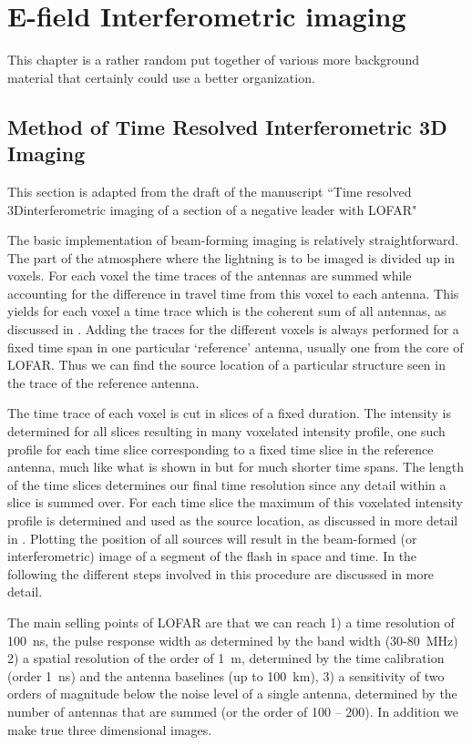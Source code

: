 \section{E-field Interferometric imaging}

This chapter is a rather random put together of various more background material that certainly could use a better organization.

\subsection{Method of Time Resolved Interferometric 3D Imaging}

This section is adapted from the draft of the manuscript ``Time resolved 3Dinterferometric imaging of a section of a negative leader with LOFAR"

The basic implementation of beam-forming imaging is relatively straightforward. The part of the atmosphere where the lightning is to be imaged is divided up in voxels. For each voxel the time traces of the antennas are summed while accounting for the difference in travel time from this voxel to each antenna. This yields for each voxel a time trace which is the coherent sum of all antennas, as discussed in . Adding the traces for the different voxels is always performed for a fixed time span in one particular `reference' antenna, usually one from the core of LOFAR. Thus we can find the source location of a particular structure seen in the trace of the reference antenna.

The time trace of each voxel is cut in slices of a fixed duration. The intensity is determined for all slices resulting in many voxelated intensity profile, one such profile for each time slice corresponding to a fixed time slice in the reference antenna, much like what is shown in  but for much shorter time spans.
The length of the time slices determines our final time resolution since any detail within a slice is summed over.
For each time slice the maximum of this voxelated intensity profile is determined and used as the source location, as discussed in more detail in . Plotting the position of all sources will result in the beam-formed (or interferometric) image of a segment of the flash in space and time. In the following the different steps involved in this procedure are discussed in more detail.

The main selling points of LOFAR are that we  can reach 1) a time resolution of 100~ns, the pulse response width as determined by the band width (30-80~MHz) 2) a spatial resolution of the order of 1~m, determined by the time calibration (order 1~ns) and the antenna baselines (up to 100~km), 3) a sensitivity of two orders of magnitude below the noise level of a single antenna, determined by the number of antennas that are summed (or the order of 100 -- 200). In addition we make true three dimensional images.

